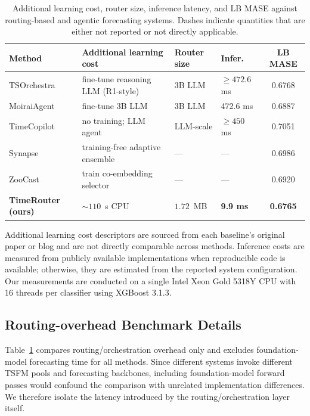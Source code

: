 \documentclass{article}
\theoremstyle{plain}
\theoremstyle{definition}
\theoremstyle{remark}
\begin{document}
\begin{table}[h]
\centering
\small
\setlength{\tabcolsep}{4pt}
\begin{tabular}{@{}p{2.8cm}p{3.8cm}p{1.7cm}p{1.5cm}c@{}}
\toprule
Method & Additional learning cost & Router size & Infer. & LB MASE \\
\midrule
TSOrchestra~\citep{tsorchestra}
& fine-tune reasoning LLM (R1-style)
& 3B LLM
& $\geq 472.6$ ms
& 0.6768 \\

MoiraiAgent~\citep{moiraiagent}
& fine-tune 3B LLM
& 3B LLM
& 472.6 ms
& 0.6887 \\

TimeCopilot~\citep{garza2025timecopilot}
& no training; LLM agent
& LLM-scale
& $\geq 450$ ms
& 0.7051 \\

Synapse~\citep{synapse}
& training-free adaptive ensemble
& ---
& ---
& 0.6986 \\

ZooCast~\citep{zoocast}
& train co-embedding selector
& ---
& ---
& 0.6920 \\

\midrule
\textbf{TimeRouter (ours)}
& $\sim110$~s CPU
& $1.72$~MB
& \textbf{9.9 ms}
& \textbf{0.6765} \\
\bottomrule
\end{tabular}
\caption{
Additional learning cost, router size, inference latency, and LB MASE against routing-based and agentic forecasting systems. 
Dashes indicate quantities that are either not reported or not directly applicable.
}
\label{tab:efficiency}
\end{table}
Additional learning cost descriptors are sourced from each baseline's original paper or blog and are not directly comparable across methods. Inference costs are measured from publicly available implementations when reproducible code is available; otherwise, they are estimated from the reported system configuration. Our measurements are conducted on a single Intel Xeon Gold 5318Y CPU with 16 threads per classifier using XGBoost 3.1.3.

\subsection{Routing-overhead Benchmark Details}
\label{app:inference-details}

Table~\ref{tab:efficiency} compares routing/orchestration overhead only and excludes foundation-model forecasting time for all methods. Since different systems invoke different TSFM pools and forecasting backbones, including foundation-model forward passes would confound the comparison with unrelated implementation differences. We therefore isolate the latency introduced by the routing/orchestration layer itself.
\end{document}
